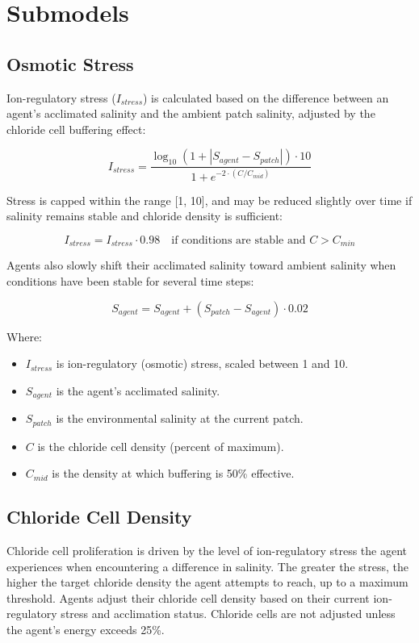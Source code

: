 \documentclass[
]{book}
\providecommand{\tightlist}{%
  \setlength{\itemsep}{0pt}\setlength{\parskip}{0pt}}
\begin{document}
\section{Submodels}\label{submodels}

\subsection{Osmotic Stress}\label{osmotic-stress}

Ion-regulatory stress (\(I_{stress}\)) is calculated based on the difference between an agent's acclimated salinity and the ambient patch salinity, adjusted by the chloride cell buffering effect:

\[
I_{stress} = \frac{\log_{10}(1 + |S_{agent} - S_{patch}|) \cdot 10}{1 + e^{-2 \cdot (C / C_{mid})}}
\]

Stress is capped within the range {[}1, 10{]}, and may be reduced slightly over time if salinity remains stable and chloride density is sufficient:

\[
I_{stress} = I_{stress} \cdot 0.98 \quad \text{if conditions are stable and } C > C_{min}
\]

Agents also slowly shift their acclimated salinity toward ambient salinity when conditions have been stable for several time steps:

\[
S_{agent} = S_{agent} + (S_{patch} - S_{agent}) \cdot 0.02
\]

Where:

\begin{itemize}
\tightlist
\item
  \(I_{stress}\) is ion-regulatory (osmotic) stress, scaled between 1 and 10.
\item
  \(S_{agent}\) is the agent's acclimated salinity.
\item
  \(S_{patch}\) is the environmental salinity at the current patch.
\item
  \(C\) is the chloride cell density (percent of maximum).
\item
  \(C_{mid}\) is the density at which buffering is 50\% effective.
\end{itemize}

\subsection{Chloride Cell Density}\label{chloride-cell-density}

Chloride cell proliferation is driven by the level of ion-regulatory stress the agent experiences when encountering a difference in salinity. The greater the stress, the higher the target chloride density the agent attempts to reach, up to a maximum threshold. Agents adjust their chloride cell density based on their current ion-regulatory stress and acclimation status. Chloride cells are not adjusted unless the agent's energy exceeds 25\%.
\end{document}
